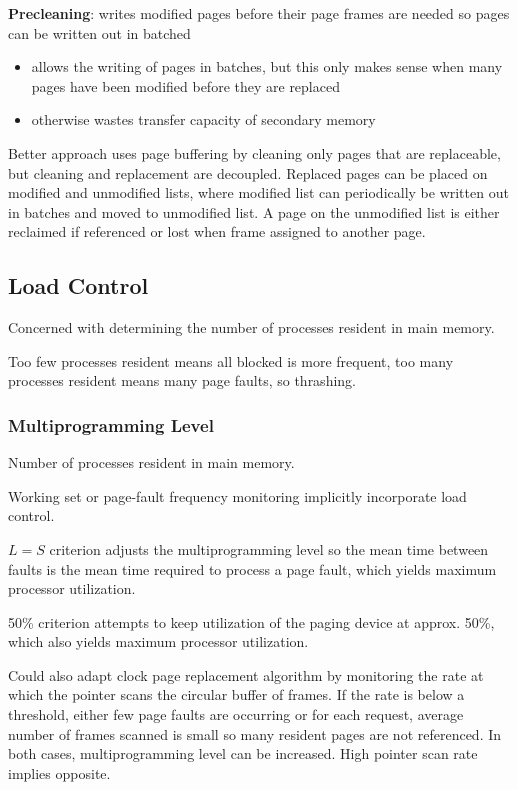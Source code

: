 \documentclass[11pt]{article}
\begin{document}
\textbf{Precleaning}: writes modified pages before their page frames are needed so pages can be
written out in batched
\begin{itemize}
\item allows the writing of pages in batches, but this only makes sense when many pages have
been modified before they are replaced
\item otherwise wastes transfer capacity of secondary memory
\end{itemize}

Better approach uses page buffering by cleaning only pages that are replaceable, but
cleaning and replacement are decoupled.
Replaced pages can be placed on modified and unmodified lists, where modified list can
periodically be written out in batches and moved to unmodified list.
A page on the unmodified list is either reclaimed if referenced or lost when frame
assigned to another page.
\subsection{Load Control}
\label{sec:org9c4c234}
Concerned with determining the number of processes resident in main memory.

Too few processes resident means all blocked is more frequent, too many processes
resident means many page faults, so thrashing.
\subsubsection{Multiprogramming Level}
\label{sec:org78ec9ce}
Number of processes resident in main memory.

Working set or page-fault frequency monitoring implicitly incorporate load control.

\(L = S\) criterion adjusts the multiprogramming level so the mean time between faults
is the mean time required to process a page fault, which yields maximum processor
utilization.

50\% criterion attempts to keep utilization of the paging device at approx. 50\%,
which also yields maximum processor utilization.

Could also adapt clock page replacement algorithm by monitoring the rate at which
the pointer scans the circular buffer of frames.
If the rate is below a threshold, either few page faults are occurring or for each
request, average number of frames scanned is small so many resident pages are not
referenced.
In both cases, multiprogramming level can be increased.
High pointer scan rate implies opposite.
\end{document}
